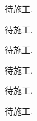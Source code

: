 \problem{}
\begin{solution}
	待施工.
\end{solution}



\problem{}
\begin{solution}
	待施工.
\end{solution}



\problem{}
\begin{solution}
	待施工.
\end{solution}



\problem{}
\begin{solution}
	待施工.
\end{solution}



\problem{}
\begin{solution}
	待施工.
\end{solution}



\problem{}
\begin{solution}
	待施工.
\end{solution}



